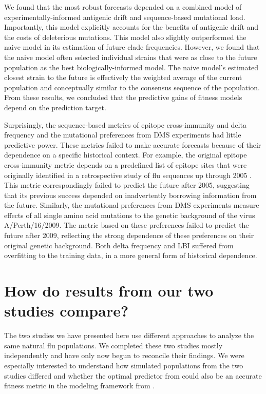We found that the most robust forecasts depended on a combined model of experimentally-informed antigenic drift and sequence-based mutational load.
Importantly, this model explicitly accounts for the benefits of antigenic drift and the costs of deleterious mutations.
This model also slightly outperformed the naive model in its estimation of future clade frequencies.
However, we found that the naive model often selected individual strains that were as close to the future population as the best biologically-informed model.
The naive model's estimated closest strain to the future is effectively the weighted average of the current population and conceptually similar to the consensus sequence of the population.
From these results, we concluded that the predictive gains of fitness models depend on the prediction target.

Surprisingly, the sequence-based metrics of epitope cross-immunity and delta frequency and the mutational preferences from DMS experiments had little predictive power.
These metrics failed to make accurate forecasts because of their dependence on a specific historical context.
For example, the original epitope cross-immunity metric \citep{Luksza:2014hj} depends on a predefined list of epitope sites that were originally identified in a retrospective study of flu sequences up through 2005 \citep{Shih:2007bd}.
This metric correspondingly failed to predict the future after 2005, suggesting that its previous success depended on inadvertently borrowing information from the future.
Similarly, the mutational preferences from DMS experiments measure effects of all single amino acid mutations to the genetic background of the virus A/Perth/16/2009.
The metric based on these preferences failed to predict the future after 2009, reflecting the strong dependence of these preferences on their original genetic background.
Both delta frequency and LBI suffered from overfitting to the training data, in a more general form of historical dependence.

\section{How do results from our two studies compare?}

The two studies we have presented here use different approaches to analyze the same natural flu populations.
We completed these two studies mostly independently and have only now begun to reconcile their findings.
We were especially interested to understand how simulated populations from the two studies differed and whether the optimal predictor from \citet{Barrat-Charlaix2020} could also be an accurate fitness metric in the modeling framework from \citet{Huddleston2020}.

